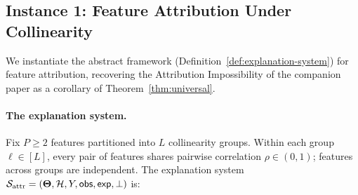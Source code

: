\subsection{Instance 1: Feature Attribution Under Collinearity}
\label{sec:instance-attribution}

We instantiate the abstract framework (Definition~\ref{def:explanation-system}) for
feature attribution, recovering the Attribution Impossibility of the companion paper
as a corollary of Theorem~\ref{thm:universal}.

\paragraph{The explanation system.}
Fix $P \geq 2$ features partitioned into $L$ collinearity groups.  Within each group
$\ell \in [L]$, every pair of features shares pairwise correlation $\rho \in (0,1)$;
features across groups are independent.  The explanation system
$\mathcal{S}_{\mathrm{attr}} = (\mathbf{\Theta},\mathcal{H},Y,\mathsf{obs},\mathsf{exp},\perp)$ is:

